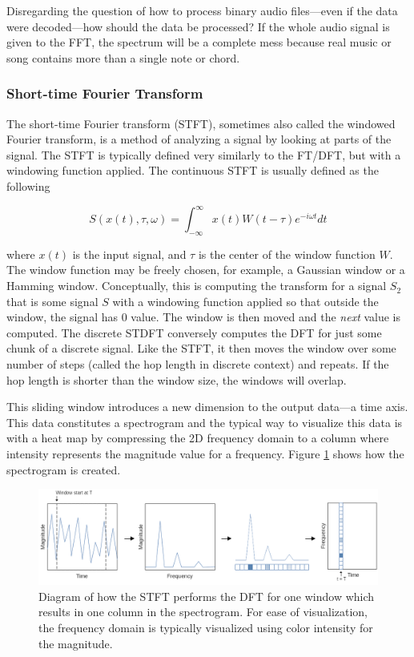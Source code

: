 Disregarding the question of how to process binary audio files—even if the data were decoded—how should the data be processed? If the whole audio signal is given to the FFT, the spectrum will be a complete mess because real music or song contains more than a single note or chord.

\subsubsection{Short-time Fourier Transform}
The short-time Fourier transform (STFT), sometimes also called the windowed Fourier transform, is a method of analyzing a signal by looking at parts of the signal. The STFT is typically defined very similarly to the FT/DFT, but with a windowing function applied. The continuous STFT is usually defined as the following

$$S(x(t), \tau, \omega ) = \int_{-\infty}^{\infty} x(t)W(t-\tau)e^{-i\omega t}dt$$

\noindent where $x(t)$ is the input signal, and $\tau$ is the center of the window function $W$. The window function may be freely chosen, for example, a Gaussian window or a Hamming window. Conceptually, this is computing the transform for a signal $S_2$ that is some signal $S$ with a windowing function applied so that outside the window, the signal has 0 value. The window is then moved and the \textit{next} value is computed. The discrete STDFT conversely computes the DFT for just some chunk of a discrete signal. Like the STFT, it then moves the window over some number of steps (called the hop length in discrete context) and repeats. If the hop length is shorter than the window size, the windows will overlap.

This sliding window introduces a new dimension to the output data—a time axis. This data constitutes a spectrogram and the typical way to visualize this data is with a heat map by compressing the 2D frequency domain to a column where intensity represents the magnitude value for a frequency. Figure \ref{fig:stft} shows how the spectrogram is created.

\begin{figure}[ht]
    \centering
    \includegraphics[width=\textwidth]{./images/stft.png}
    \caption{Diagram of how the STFT performs the DFT for one window which results in one column in the spectrogram. For ease of visualization, the frequency domain is typically visualized using color intensity for the magnitude. \label{fig:stft}}
\end{figure}

